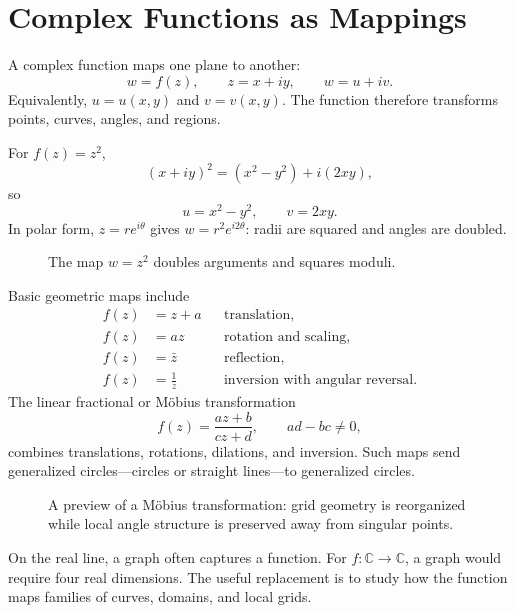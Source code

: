 \section{Complex Functions as Mappings}
\label{sec:ch5-complex-functions}

A complex function maps one plane to another:
\[
w=f(z),\qquad z=x+iy,\qquad w=u+iv.
\]
Equivalently, $u=u(x,y)$ and $v=v(x,y)$. The function therefore transforms points, curves, angles, and regions.

For $f(z)=z^2$,
\[
(x+iy)^2=(x^2-y^2)+i(2xy),
\]
so
\[
u=x^2-y^2,\qquad v=2xy.
\]
In polar form, $z=re^{i\theta}$ gives $w=r^2e^{i2\theta}$: radii are squared and angles are doubled.

\begin{figure}[htbp]
\centering

\caption{The map $w=z^2$ doubles arguments and squares moduli.}
\label{fig:ch5-square-map}
\end{figure}

Basic geometric maps include
\begin{align}
f(z)&=z+a &&\text{translation},\\
f(z)&=az &&\text{rotation and scaling},\\
f(z)&=\bar z &&\text{reflection},\\
f(z)&=\frac{1}{z} &&\text{inversion with angular reversal}.
\end{align}
The linear fractional or M\"obius transformation
\[
f(z)=\frac{az+b}{cz+d},\qquad ad-bc\neq0,
\]
combines translations, rotations, dilations, and inversion. Such maps send generalized circles---circles or straight lines---to generalized circles.

\begin{figure}[htbp]
\centering

\caption{A preview of a M\"obius transformation: grid geometry is reorganized while local angle structure is preserved away from singular points.}
\label{fig:ch5-mobius-preview}
\end{figure}

\begin{keyidea}
On the real line, a graph often captures a function. For $f:\mathbb C\to\mathbb C$, a graph would require four real dimensions. The useful replacement is to study how the function maps families of curves, domains, and local grids.
\end{keyidea}
